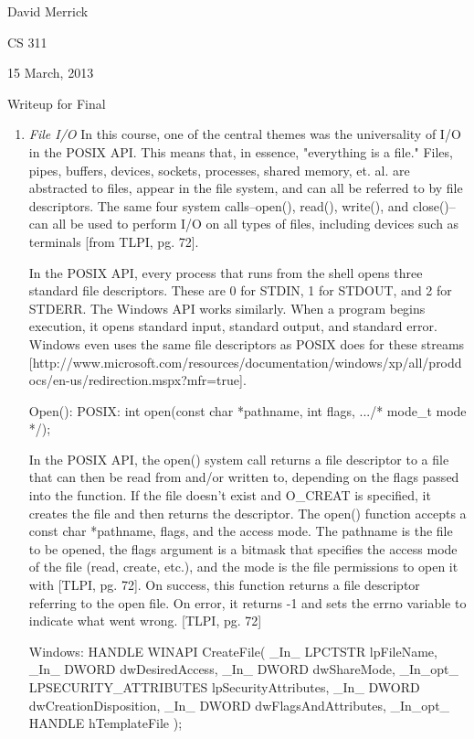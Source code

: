 \documentclass[letterpaper,10pt,titlepage]{article}
\begin{document}
David Merrick

CS 311

15 March, 2013

\begin{center}
{\LARGE Writeup for Final}
\end{center}

\begin{enumerate}
\item \emph{File I/O}
In this course, one of the central themes was the universality of I/O in the POSIX API. This means that, in essence, "everything is a file." Files, pipes, buffers, devices, sockets, processes, shared memory, et. al. are abstracted to files, appear in the file system, and can all be referred to by file descriptors. The same four system calls--open(), read(), write(), and close()--can all be used to perform I/O on all types of files, including devices such as terminals [from TLPI, pg. 72].

In the POSIX API, every process that runs from the shell opens three standard file descriptors. These are 0 for STDIN, 1 for STDOUT, and 2 for STDERR. The Windows API works similarly. When a program begins execution, it opens standard input, standard output, and standard error. Windows even uses the same file descriptors as POSIX does for these streams [http://www.microsoft.com/resources/documentation/windows/xp/all/proddocs/en-us/redirection.mspx?mfr=true]. 

Open():
POSIX: 
int open(const char *pathname, int flags, .../* mode_t mode */);

In the POSIX API, the open() system call returns a file descriptor to a file that can then be read from and/or written to, depending on the flags passed into the function. If the file doesn't exist and O_CREAT is specified, it creates the file and then returns the descriptor. The open() function accepts a const char *pathname, flags, and the access mode. The pathname is the file to be opened, the flags argument is a bitmask that specifies the access mode of the file (read, create, etc.), and the mode is the file permissions to open it with [TLPI, pg. 72]. On success, this function returns a file descriptor referring to the open file. On error, it returns -1 and sets the errno variable to indicate what went wrong. [TLPI, pg. 72]

Windows:
HANDLE WINAPI CreateFile(
  _In_      LPCTSTR lpFileName,
  _In_      DWORD dwDesiredAccess,
  _In_      DWORD dwShareMode,
  _In_opt_  LPSECURITY_ATTRIBUTES lpSecurityAttributes,
  _In_      DWORD dwCreationDisposition,
  _In_      DWORD dwFlagsAndAttributes,
  _In_opt_  HANDLE hTemplateFile
);


\end{enumerate}
\end{document}
